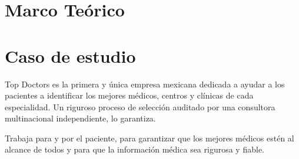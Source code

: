 \documentclass[12pt,letter]{report}
\begin{document}
\tableofcontents
\listoffigures
\listoftables

\chapter{Marco Teórico}



\chapter{Caso de estudio}
Top Doctors es la primera y única empresa mexicana dedicada a ayudar a los pacientes a identificar los mejores médicos, centros y clínicas de cada especialidad. Un riguroso proceso de selección auditado por una consultora multinacional independiente, lo garantiza.

Trabaja para y por el paciente, para garantizar que los mejores médicos estén al alcance de todos y para que la información médica sea rigurosa y fiable. 




\nocite{*} %


\end{document}
